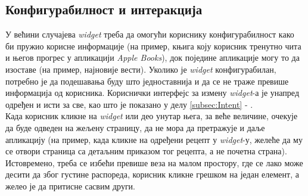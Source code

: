 \documentclass[12pt,oneside]{memoir}
\begin{document}
\subsection{Конфигурабилност и интеракција}
\indent У већини случајева \textit{widget} треба да омогући кориснику конфигурабилност како би пружио корисне информације (на пример, књига коју корисник тренутно чита и његов прогрес у апликацији \textit{Apple Books}), док поједине апликације могу то да изоставе (на пример, најновије вести). Уколико је \textit{widget} конфигурабилан, потребно је да подешавања буду што једноставнија и да се не траже превише информација од корисника. Кориснички интерфејс за измену \textit{widget}-а је унапред одређен и исти за све, као што је показано у делу \ref{subsec:Intent} - .
\\
\indent Када корисник кликне на \textit{widget} или део унутар њега, за веће величине, очекује да буде одведен на жељену страницу, да не мора да претражује и даље апликацију (на пример, када кликне на одређени рецепт у \textit{widget}-у, желеће да му се отвори страница са детаљним приказом тог рецепта, а не почетна страна). Истовремено, треба се избећи превише веза на малом простору, где се лако може десити да због густине распореда, корисник кликне грешком на један елемент, а желео је да притисне сасвим други.
\end{document}
